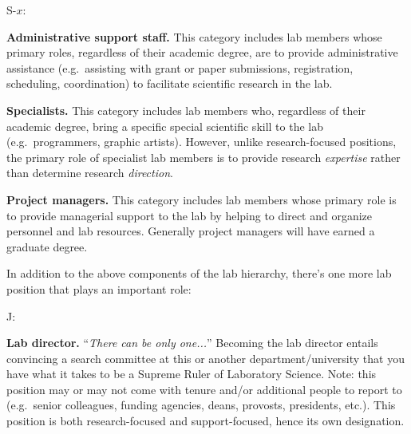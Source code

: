 \documentclass{tufte-book} %
\begin{document}
\begin{list}{S-$x$:~}{}
\item \textbf{Administrative support staff.}  This category includes
  lab members whose primary roles, regardless of their academic
  degree, are to provide administrative assistance (e.g.\ assisting with
  grant or paper submissions, registration, scheduling, coordination)
  to facilitate scientific research in the lab.
\item \textbf{Specialists.}  This category includes lab
  members who, regardless of their academic degree, bring
  a specific special scientific skill to the lab (e.g.\ programmers, graphic
  artists).  However, unlike research-focused positions, the primary
  role of specialist lab members is to provide research \textit{expertise}
  rather than determine research \textit{direction}.
\item \textbf{Project managers.}  This category includes lab members
  whose primary role is to provide managerial support to the lab by
  helping to direct and organize personnel and lab resources.
  Generally project managers will have earned a graduate degree.
\end{list}
In addition to the above components of the lab hierarchy, there's one more
lab position that plays an important role:
\begin{list}{J:~}{}
\item \textbf{Lab director.}  ``\textit{There can be only one...}''
  Becoming the lab director entails convincing a search committee
  at this or another department/university that you have what it takes to be a
  Supreme Ruler of Laboratory Science. Note: this position may or may not come with
  tenure and/or additional people to report to (e.g.\ senior
  colleagues, funding
  agencies, deans, provosts, presidents, etc.).  This position is both
  research-focused and support-focused, hence its own designation.
\end{list}

\newpage
\end{document}
